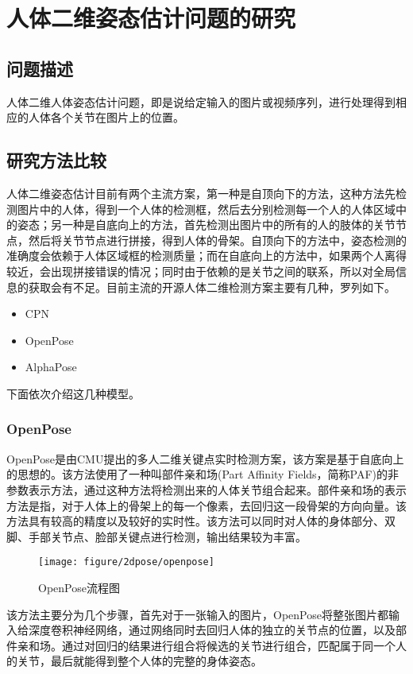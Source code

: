 \section{人体二维姿态估计问题的研究}
\subsection{问题描述}
人体二维人体姿态估计问题，即是说给定输入的图片或视频序列，进行处理得到相应的人体各个关节在图片上的位置。
\subsection{研究方法比较}
人体二维姿态估计目前有两个主流方案，第一种是自顶向下的方法，这种方法先检测图片中的人体，得到一个人体的检测框，然后去分别检测每一个人的人体区域中的姿态；另一种是自底向上的方法，首先检测出图片中的所有的人的肢体的关节节点，然后将关节节点进行拼接，得到人体的骨架。自顶向下的方法中，姿态检测的准确度会依赖于人体区域框的检测质量；而在自底向上的方法中，如果两个人离得较近，会出现拼接错误的情况；同时由于依赖的是关节之间的联系，所以对全局信息的获取会有不足。目前主流的开源人体二维检测方案主要有几种，罗列如下。
\begin{itemize}
    \item CPN 
    \item OpenPose
    \item AlphaPose
\end{itemize}
下面依次介绍这几种模型。
\subsubsection{OpenPose}
OpenPose是由CMU提出的多人二维关键点实时检测方案，该方案是基于自底向上的思想的。该方法使用了一种叫部件亲和场(Part Affinity Fields，简称PAF)的非参数表示方法，通过这种方法将检测出来的人体关节组合起来。部件亲和场的表示方法是指，对于人体上的骨架上的每一个像素，去回归这一段骨架的方向向量。该方法具有较高的精度以及较好的实时性。该方法可以同时对人体的身体部分、双脚、手部关节点、脸部关键点进行检测，输出结果较为丰富。
\begin{figure}[H]
    \centering
    \texttt{[image: figure/2dpose/openpose]}
    \caption{\label{fig:2d-op} OpenPose流程图}
\end{figure}
该方法主要分为几个步骤，首先对于一张输入的图片，OpenPose将整张图片都输入给深度卷积神经网络，通过网络同时去回归人体的独立的关节点的位置，以及部件亲和场。通过对回归的结果进行组合将候选的关节进行组合，匹配属于同一个人的关节，最后就能得到整个人体的完整的身体姿态。

